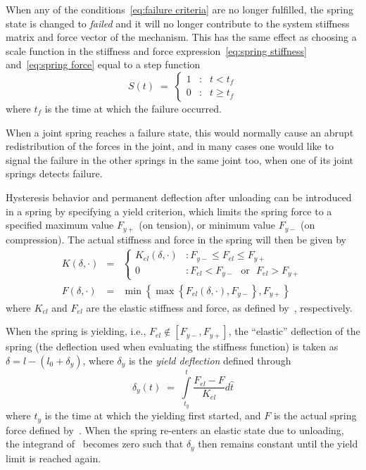 When any of the conditions~\eqref{eq:failure criteria} are no longer fulfilled,
the spring state is changed to \textit{failed} and it will no longer contribute
to the system stiffness matrix and force vector of the mechanism.
This has the same effect as choosing a scale function in the stiffness and
force expression~\eqref{eq:spring stiffness} and~\eqref{eq:spring force}
equal to a step function
%
\begin{equation}
S(t) \;=\; \left\{\begin{array}{lcl}
1 &:& t < t_f \\
0 &:& t \ge t_f
\end{array}\right.
\end{equation}
%
where $t_f$ is the time at which the failure occurred.

When a joint spring reaches a failure state, this would normally cause an abrupt
redistribution of the forces in the joint, and in many cases one would like to
signal the failure in the other springs in the same joint too,
when one of its joint springs detects failure.

Hysteresis behavior and permanent deflection after unloading can be introduced
in a spring by specifying a yield criterion, which limits the spring force to
a specified maximum value $F_{y+}$ (on tension),
or minimum value $F_{y-}$ (on compression).
The actual stiffness and force in the spring will then be given by
%
\begin{eqnarray}
K(\delta,\cdot) &=& \left\{\begin{array}{ll}
K_{el}(\delta,\cdot) &: F_{y-} \le F_{el} \le F_{y+} \\[2mm]
0                    &: F_{el} < F_{y-} \text{~~or~~} F_{el} > F_{y+}
\end{array}\right. \\[2mm]
F(\delta,\cdot) &=& \min\left\{\max\left\{ F_{el}(\delta,\cdot),
F_{y-}\right\}, F_{y+}\right\} \label{eq:actual spring force}
\end{eqnarray}
%
where $K_{el}$ and $F_{el}$ are the elastic stiffness and force,
as defined by~, respectively.

When the spring is yielding, i.e., $F_{el} \notin [F_{y-},F_{y+}]$, the
``elastic'' deflection of the spring (the deflection used when evaluating the
stiffness function) is taken as $\delta = l - (l_0 + \delta_y)$,
where $\delta_y$ is the \textit{yield deflection} defined through
%
\begin{equation}
\delta_y(t) \;=\; \int\limits_{t_y}^t \frac{F_{el}-F}{K_{el}} d\hat{t}
\label{eq:yield deflection}
\end{equation}
%
where $t_y$ is the time at which the yielding first started, and $F$ is the
actual spring force defined by~.
When the spring re-enters an elastic state due to unloading, the integrand
of~ becomes zero such that $\delta_y$ then
remains constant until the yield limit is reached again.


